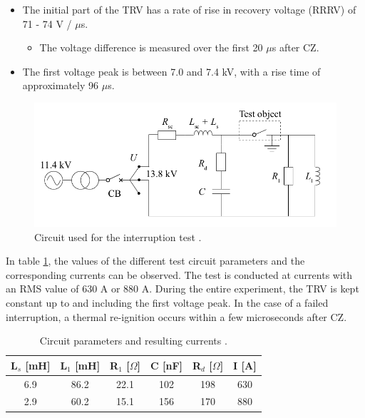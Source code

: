 \documentclass[10pt,b5paper,twoside]{article}
\begin{document}
\begin{itemize}
\item The initial part of the TRV has a rate of rise in recovery voltage (RRRV) of 71 - 74 V / $\mu$s.
	\begin{itemize}
		\item The voltage difference is measured over the first 20 $\mu$s after CZ.
	\end{itemize}
\item The first voltage peak is between 7.0 and 7.4 kV, with a rise time of approximately 96 $\mu$s.
\end{itemize}

\begin{figure} [H]
\centering
\includegraphics[scale=0.35]{Bilder/Method/circuit.png}
\caption{Circuit used for the interruption test \cite{bib:AFIMVLBA}.} \label{fig:testCurcuit}
\end{figure}

In table \ref{tab:testParameters}, the values of the different test circuit parameters and the corresponding currents can be observed. The test is conducted at currents with an RMS value of 630 A or 880 A. During the entire experiment, the TRV is kept constant up to and including the first voltage peak. In the case of a failed interruption, a thermal re-ignition occurs within a few microseconds after CZ.

\begin{table}[H]
\center
\caption{Circuit parameters and resulting currents \cite{bib:AFIMVLBA}. }
\begin{tabular}{|c|c|c|c|c|c|}
\hline 
L$_s$ [mH] & L$_1$ [mH] & R$_1$ [$\Omega$] & C [nF] & R$_{d}$ [$\Omega$] & I [A] \\ 
\hline 
6.9 & 86.2 & 22.1 & 102 & 198 & 630 \\ 
\hline
2.9 & 60.2 & 15.1 & 156 & 170 & 880 \\
\hline   
\end{tabular} 
\label{tab:testParameters}
\end{table}
\end{document}
